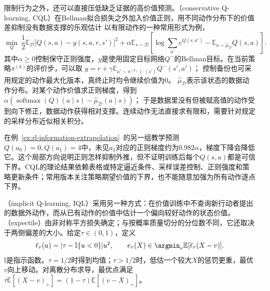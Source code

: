 限制行为之外，还可以直接压低缺乏证据的高价值预测。（conservative Q-learning, CQL）在Bellman拟合损失之外加入价值正则，用不同动作分布下的价值差抑制没有数据支撑的乐观估计
以有限动作的一种常用形式为例，
\begin{equation}
  \label{eq:rl-information-cql}
  \min_Q\
  \frac12\mathbb E_{\mathcal D}\bigl[Q(s,a)-y(s,a,r,s')\bigr]^2
  +\alpha\mathbb E_{s\sim\mathcal D}
       \left[\log\sum_{a'}e^{Q(s,a')}
                       -\mathbb E_{a\sim\widehat\mu_{\mathcal D}}Q(s,a)\right].
\end{equation}
其中$\alpha\geq0$控制保守正则强度，$y$是使用固定目标网络$Q^-$的Bellman目标。在当前策略$\pi^{(k)}$的评价步，可以取
$y=r+\gamma\mathbb E_{a'\sim\pi^{(k)}(\cdot\mid s')}Q^-(s',a')$；
控制备份也可采用规定的动作最大化版本，真终止时均令继续价值为0。
$\widehat\mu_{\mathcal D}$表示该状态的数据动作分布。对某个动作价值求正则梯度，得到
$\alpha(\operatorname{softmax}(Q)(a\mid s)-\widehat\mu_{\mathcal D}(a\mid s))$；
于是数据里没有但被赋高值的动作受到向下修正，数据动作获得相对支撑。连续动作无法直接求有限和，需要针对规定的采样分布近似相关积分。

在例~\ref{ex:rl-information-extrapolation}~的另一组教学预测
$Q(a_0)=0,Q(a_1)=4$中，未见$a_1$对应的正则梯度约为$0.982\alpha$，梯度下降会降低它。这个局部方向说明正则怎样抑制外推，但不证明训练后每个$Q(s,a)$都是可信下界。CQL的理论结果依赖表格或特定逼近条件、采样误差控制、正则强度和策略更新条件；常用版本关注策略期望价值的下界，也不能随意加强为所有动作逐点下界。

（implicit Q-learning, IQL）采用另一种方式：在价值训练中不查询新行动者提出的数据外动作，而从已有动作的价值中估计一个偏向较好动作的状态价值。（expectile）由非对称平方损失确定；与按概率质量切分的分位数不同，它还取决于两侧偏差的大小。给定$\tau\in(0,1)$，定义
\begin{equation}
  \label{eq:rl-information-expectile}
  \ell_\tau(u)=|\tau-\mathbb I\{u<0\}|u^2,\qquad
  e_\tau(X)\in\argmin_v\mathbb E[\ell_\tau(X-v)].
\end{equation}
$\mathbb I$是指示函数。$\tau=1/2$时得到均值；$\tau>1/2$时，低估一个较大$X$的惩罚更重，最优$v$向上移动。对离散分布求导，最优点满足
$\tau\mathbb E[(X-v)_+]=(1-\tau)\mathbb E[(v-X)_+]$。

